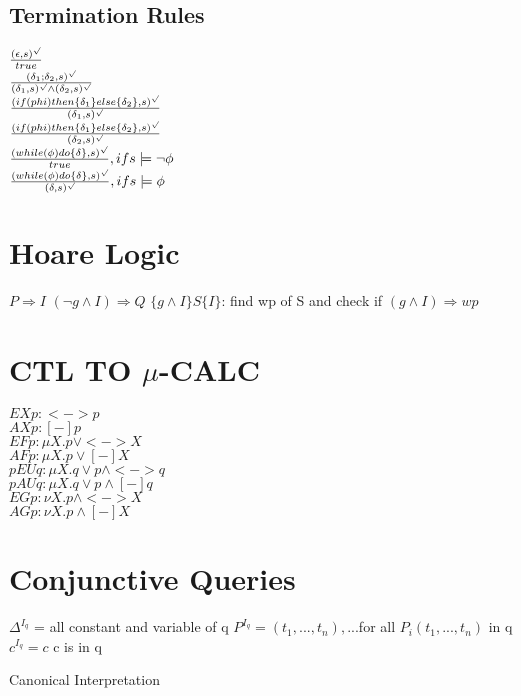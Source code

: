 \documentclass{article}
\begin{document}
\subsection{Termination Rules}
$\frac{(\epsilon,s)^{\surd}}{true}$\\[2mm]
$\frac{(\delta_1;\delta_2,s)^{\surd}}{(\delta_1,s)^{\surd}\wedge(\delta_2,s)^{\surd}}$\\[2mm]
$\frac{(if(\\phi)then\{\delta_1\}else\{\delta_2\},s)^{\surd}}{(\delta_1,s)^{\surd}}$\\[2mm]
$\frac{(if(\\phi)then\{\delta_1\}else\{\delta_2\},s)^{\surd}}{(\delta_2,s)^{\surd}}$\\[2mm]
$\frac{(while(\phi)do\{\delta\},s)^{\surd}}{true}, if s\models\neg\phi$\\[2mm]
$\frac{(while(\phi)do\{\delta\},s)^{\surd}}{(\delta,s)^{\surd}}, if s\models\phi$\\[2mm]
\section{Hoare Logic}
$P\Rightarrow I$ \newline
$(\neg g \wedge I)\Rightarrow Q$ \newline
$\{g \wedge I\}S\{I\}$: find wp of S and check if $(g \wedge I)\Rightarrow wp$

\section{CTL TO $\mu$-CALC}
$EX p: <->p$\\
$AX p: [-]p$\\
$EF p: \mu X.p\vee<->X $\\
$AFp: \mu X.p\vee[-]X $\\
$pEUq: \mu X. q\vee p \wedge <->q $\\
$pAUq: \mu X. q\vee p \wedge [-]q $\\
$EGp: \nu X.p\wedge<->X$\\
$AGp: \nu X.p\wedge[-]X$\\

\section{Conjunctive Queries}

	\begin{algorithm}
		$\Delta^{I_q}$ = all constant and variable of q \;
		$P^{I_q}={(t_1,...,t_n),...} $for all $P_i(t_1,...,t_n)$ in q\;
		$c^{I_q}=c$ c is in q \;
		\caption{Canonical Interpretation}
	\end{algorithm}
\end{document}
